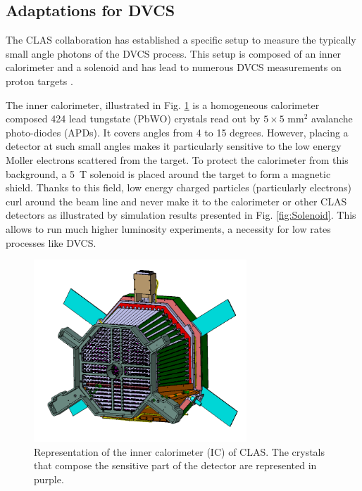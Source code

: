 \documentclass{article}
\begin{document}
\subsection{Adaptations for DVCS}

The CLAS collaboration has established a specific setup to measure the typically 
small angle photons of the DVCS process. This setup is composed of an inner 
calorimeter and a solenoid and has lead to numerous DVCS measurements on proton 
targets \cite{Seder:2014cdc,Jo:2015ema,HirlingerSaylor:2018bnu}.

The inner calorimeter, illustrated in Fig. \ref{fig:IC} is a homogeneous 
calorimeter composed 424 lead tungstate 
(PbWO) crystals read out by $5 \times 5$ mm$^2$ avalanche photo-diodes (APDs). 
It covers angles from 4 to 15 degrees. However, placing a detector at such small angles makes it 
particularly sensitive to the low energy Moller electrons scattered from the target.
To protect the calorimeter from this background, a 5~T solenoid is 
placed around the target to form
a magnetic shield. Thanks to this field, low energy charged particles (particularly 
electrons) curl around the beam line 
and never make it to the calorimeter or other CLAS detectors as illustrated 
by simulation results presented 
in Fig. \ref{fig:Solenoid}. This allows to run much higher luminosity experiments,
a necessity for low rates processes like DVCS.

\begin{figure}[tbp!]
\center
\includegraphics[width=8cm]{fig3/IC-CLAS.png}
	\caption{Representation of the inner calorimeter (IC) of CLAS. The crystals that compose the
	sensitive part of the detector are represented in purple.}
\label{fig:IC}
\end{figure}
\end{document}
